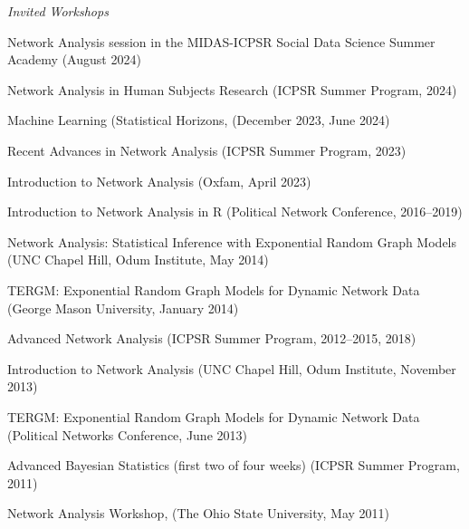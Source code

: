 \documentclass[overlapped,line]{res}
\begin{document}
\begin{resume}
\hspace{-1cm} \emph{Invited Workshops} 
\begin{etaremune}
\item Network Analysis session in the MIDAS-ICPSR Social Data Science Summer Academy (August 2024)
\item Network Analysis in Human Subjects Research (ICPSR Summer Program, 2024)
\item Machine Learning (Statistical Horizons, (December 2023, June 2024)
\item Recent Advances in Network Analysis (ICPSR Summer Program, 2023)
\item Introduction to Network Analysis (Oxfam, April 2023)
\item Introduction to Network Analysis in R (Political Network Conference, 2016--2019)
\item Network Analysis: Statistical Inference with Exponential Random Graph Models (UNC Chapel Hill, Odum Institute, May 2014)
\item TERGM: Exponential Random Graph Models for Dynamic Network Data (George Mason University, January 2014)
\item Advanced Network Analysis (ICPSR Summer Program, 2012--2015, 2018)
\item Introduction to Network Analysis (UNC Chapel Hill, Odum Institute, November 2013)
\item TERGM: Exponential Random Graph Models for Dynamic Network Data (Political Networks Conference, June 2013)
\item Advanced Bayesian Statistics (first two of four weeks) (ICPSR Summer Program, 2011)
\item Network Analysis Workshop, (The Ohio State University, May 2011)
\end{etaremune}


\end{resume}
\end{document}

